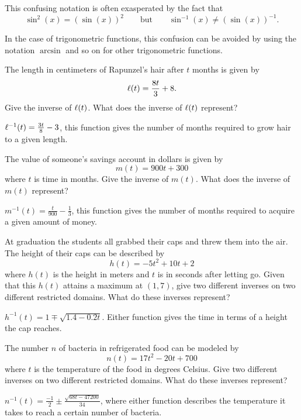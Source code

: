 This confusing notation is often exasperated by the fact that 
\[
\sin^2(x) = (\sin(x))^2\qquad \text{but} \qquad \sin^{-1}(x)
\ne(\sin(x))^{-1}.
\]

In the case of trigonometric functions, this confusion can be avoided
by using the notation $\arcsin$ and so on for other trigonometric
functions.




\begin{exercises}

\begin{exercise}
The length in centimeters of Rapunzel's hair after $t$ months is given
by
\[
\ell(t) = \frac{8t}{3}+8.
\]
Give the inverse of $\ell(t)$.  What does the inverse of $\ell(t)$
 represent?
\begin{answer}
$\ell^{-1}(t) = \frac{3t}{8} - 3$, this function gives the number of
  months required to grow hair to a given length.
\end{answer}
\end{exercise}

\begin{exercise}
The value of someone's savings account in dollars is given by
\[
m(t) = 900t + 300
\]
where $t$ is time in months. Give the inverse of $m(t)$.  What does 
the inverse of $m(t)$ represent?
\begin{answer}
$m^{-1}(t) = \frac{t}{900} - \frac{1}{3}$, this function gives the
  number of months required to acquire a given amount of money.
\end{answer}
\end{exercise}

\begin{exercise}
At graduation the students all grabbed their caps and threw them into
the air.  The height of their caps can be described by 
\[
h(t) = -5t^2+10t+2
\]
where $h(t)$ is the height in meters and $t$ is in seconds after
letting go. Given that this $h(t)$ attains a maximum at $(1,7)$, give two
different inverses on two different restricted domains. What do these
inverses represent?
\begin{answer}
$h^{-1}(t) = 1 \mp \sqrt{1.4-0.2t}$.  Either function gives the time
  in terms of a height the cap reaches.
\end{answer}
\end{exercise}

\begin{exercise}
The number $n$ of bacteria in refrigerated food can be modeled by
\[
n(t) =17t^2 - 20t + 700
\]
where $t$ is the temperature of the food in degrees Celsius.  Give two
different inverses on two different restricted domains. What do these
inverses represent?
\begin{answer}
$n^{-1}(t)= \frac{-1}{2} \pm \frac{\sqrt{68t-47200}}{34}$, where
  either function describes the temperature it takes to reach a
  certain number of bacteria.
\end{answer}
\end{exercise}



\end{exercises}
